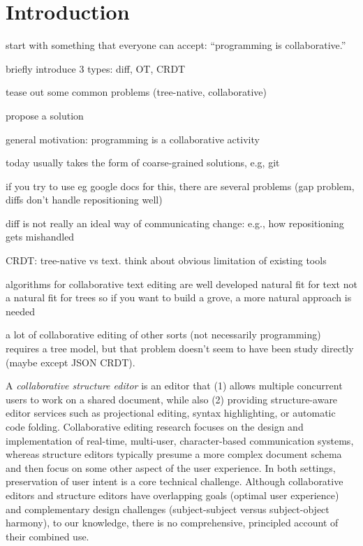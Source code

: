 
\section{Introduction}%
\label{sec:Introduction}


start with something that everyone can accept: ``programming is collaborative.''

briefly introduce 3 types: diff, OT, CRDT

tease out some common problems (tree-native, collaborative)

propose a solution





general motivation: programming is a collaborative activity

today usually takes the form of coarse-grained solutions, e.g, git

if you try to use eg google docs for this, there are several problems
(gap problem, diffs don't handle repositioning well)

diff is not really an ideal way of communicating change: e.g., how repositioning gets mishandled

CRDT: tree-native vs text. think about obvious limitation of existing tools



algorithms for collaborative text editing are well developed
natural fit for text
not a natural fit for trees
so if you want to build a grove, a more natural approach is needed


a lot of collaborative editing of other sorts (not necessarily programming) requires a tree model,
but that problem doesn't seem to have been study directly (maybe except JSON CRDT).

A \emph{collaborative structure editor} is an editor that
(1) allows multiple concurrent users to work on a shared document, while also
(2) providing structure-aware editor services such as projectional editing, syntax highlighting, or automatic code folding.
%
Collaborative editing research focuses on the design and implementation of real-time, multi-user, character-based communication systems,
whereas structure editors typically presume a more complex document schema and then focus on some other aspect of the user experience.
In both settings, preservation of user intent is a core technical challenge.
%
Although collaborative editors and structure editors have overlapping goals (optimal user experience)
and complementary design challenges (subject-subject versus subject-object harmony),
to our knowledge, there is no comprehensive, principled account of their combined use.

